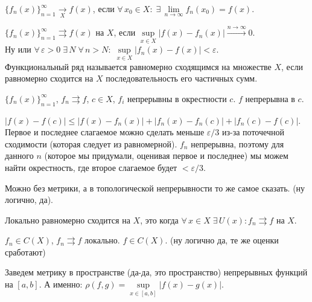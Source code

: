 
\begin{defin*}
	$\{f_n(x)\}_{n=1}^\infty\xrightarrow[X]{}f(x)$, если $\forall\,x_0\in X:\;\exists\,\lim\limits_{n\to\infty}f_n(x_0)=f(x)$.
\end{defin*}

\begin{defin*}
	$\{f_n(x)\}_{n=1}^\infty\rightrightarrows f(x)$ на $X$, если $\sup\limits_{x\in X} |f(x)-f_n(x)|\xrightarrow{n\to\infty} 0$.\\
	Ну или $\forall\,\varepsilon>0\;\exists\,N\;\forall\,n>N:\;\sup\limits_{x\in X}|f_n(x)-f(x)|<\varepsilon$.\\
	Функциональный ряд называется равномерно сходящимся на множестве $X$, если равномерно сходится на $X$ последовательность его частичных сумм.
\end{defin*}

\begin{Theorem*}
	$\{f_n(x)\}_{n=1}^\infty$, $f_n\rightrightarrows f$, $c\in X$, $f_i$ непрерывны в окрестности $c$. \THEN $f$ непрерывна в $c$.
\end{Theorem*}

\begin{Proof}
	$|f(x)-f(c)|\leqslant|f(x)-f_n(x)|+|f_n(x)-f_n(c)|+|f_n(c)-f(c)|$. Первое и последнее слагаемое можно сделать меньше $\varepsilon/3$ из-за поточечной сходимости (которая следует из равномерной). $f_n$ непрерывна, поэтому для данного $n$ (которое мы придумали, оценивая первое и последнее) мы можем найти окрестность, где второе слагаемое будет $<\varepsilon/3$.
\end{Proof}

\begin{NB*}[1]
	Можно без метрики, а в топологической непрерывности то же самое сказать. (ну логично, да).
\end{NB*}

\begin{NB*}[2!]
	Локально равномерно сходится на $X$, это когда $\forall\,x\in X\;\exists\,U(x)\colon f_n\rightrightarrows f$ на $X$.
\end{NB*}

\begin{Corollary*}
	$f_n\in C(X)$, $f_n\rightrightarrows f$ локально. \THEN $f\in C(X)$. (ну логично да, те же оценки сработают)
\end{Corollary*}

\begin{defin*}
    Заведем метрику в пространстве (да-да, это пространство) непрерывных функций на $[a,b]$. А именно: $\rho(f,g)=\sup\limits_{x\in[a,b]}|f(x)-g(x)|$.
\end{defin*}

